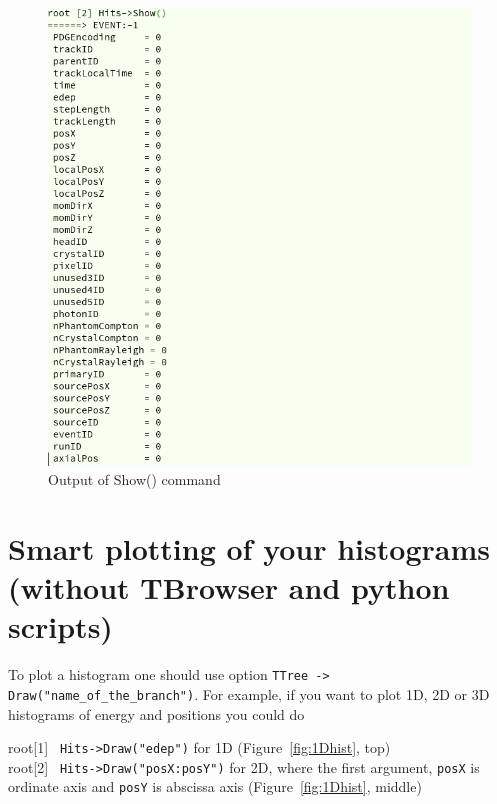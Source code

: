 \documentclass[12pt]{article}
\begin{document}
\begin{figure}[h]
\centering
\includegraphics[scale=0.5]{figs/Show.png}
\caption{Output of Show() command}
\label{fig:Show}
\end{figure}



\section{Smart plotting of your histograms (without TBrowser and python scripts)}
To plot a histogram one should use option \verb|TTree -> Draw("name_of_the_branch")|. For example, if you want to plot 1D, 2D or 3D histograms of energy and positions you could do    

root[1] \verb| Hits->Draw("edep")| for 1D (Figure~\ref{fig:1Dhist}, top) \\

root[2] \verb| Hits->Draw("posX:posY")| for 2D, where the first argument, \verb|posX| is ordinate axis and \verb|posY| is abscissa axis  (Figure~\ref{fig:1Dhist}, middle)\\
\end{document}
